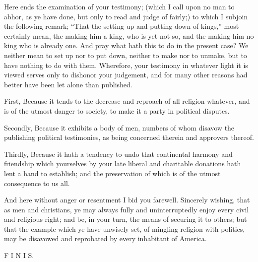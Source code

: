 \documentclass[12pt,oneside]{memoir}
\begin{document}
Here ends the examination of your testimony; (which I call upon no man to abhor, as ye have done, but only to read and judge of fairly;) to which I subjoin the following remark; ``That the setting up and putting down of kings,'' most certainly mean, the making him a king, who is yet not so, and the making him no king who is already one. And pray what hath this to do in the present case? We neither mean to set up nor to put down, neither to make nor to unmake, but to have nothing to do with them. Wherefore, your testimony in whatever light it is viewed serves only to dishonor your judgement, and for many other reasons had better have been let alone than published.

First, Because it tends to the decrease and reproach of all religion whatever, and is of the utmost danger to society, to make it a party in political disputes.

Secondly, Because it exhibits a body of men, numbers of whom disavow the publishing political testimonies, as being concerned therein and approvers thereof.

Thirdly, Because it hath a tendency to undo that continental harmony and friendship which yourselves by your late liberal and charitable donations hath lent a hand to establish; and the preservation of which is of the utmost consequence to us all.

And here without anger or resentment I bid you farewell. Sincerely wishing, that as men and christians, ye may always fully and uninterruptedly enjoy every civil and religious right; and be, in your turn, the means of securing it to others; but that the example which ye have unwisely set, of mingling religion with politics, may be disavowed and reprobated by every inhabitant of America.

F  I  N  I  S.
\end{document}
